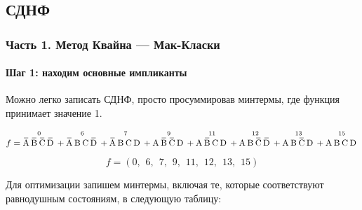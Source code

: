 \documentclass[a4paper, 14pt]{extarticle}
\begin{document}
\subsection{СДНФ}

\subsubsection{Часть 1. Метод Квайна — Мак-Класки}

\paragraph{Шаг 1: находим основные импликанты}

\vspace{10pt}

Можно легко записать СДНФ, просто просуммировав минтермы, где функция принимает значение 1. 

\begin{equation*}
  f = \overset{0}{\OV{A}\OV{B}\OV{C}\OV{D}} + \overset{6}{\OV{A}\NOV{B}\NOV{C}\OV{D}} + 
  \overset{7}{\OV{A}\NOV{B}\NOV{C}\NOV{D}} + \overset{9}{\NOV{A}\OV{B}\OV{C}\NOV{D}} + 
  \overset{11}{\NOV{A}\OV{B}\NOV{C}\NOV{D}} + \overset{12}{\NOV{A}\NOV{B}\OV{C}\OV{D}} + 
  \overset{13}{\NOV{A}\NOV{B}\OV{C}\NOV{D}} + \overset{15}{\vphantom{\OV{A}}\NOV{A}\NOV{B}\NOV{C}\NOV{D}}
\end{equation*}

\begin{equation*}
  f = \left(0,\hspace{5pt} 6,\hspace{5pt} 7,\hspace{5pt} 9,\hspace{5pt} 11,
  \hspace{5pt} 12,\hspace{5pt} 13,\hspace{5pt} 15\right)
\end{equation*}

\vspace{10pt}

Для оптимизации запишем минтермы, включая те, которые соответствуют равнодушным состояниям, 
в следующую таблицу: 

\vspace{10pt}
\end{document}
